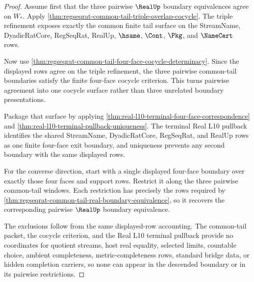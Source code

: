\begin{proof}
Assume first that the three pairwise $\RealUp$ boundary equivalences agree on $W_\ast$. Apply \autoref{thm:regseqrat-common-tail-triple-overlap-cocycle}. The triple refinement exposes exactly the common finite tail surface on the StreamName, DyadicRatCore, RegSeqRat, RealUp, $\hsame$, $\Cont$, $\Pkg$, and $\NameCert$ rows.

Now use \autoref{thm:regseqrat-common-tail-four-face-cocycle-determinacy}. Since the displayed rows agree on the triple refinement, the three pairwise common-tail boundaries satisfy the finite four-face cocycle criterion. This turns pairwise agreement into one cocycle surface rather than three unrelated boundary presentations.

Package that surface by applying \autoref{thm:real-l10-terminal-four-face-correspondence} and \autoref{thm:real-l10-terminal-pullback-uniqueness}. The terminal Real L10 pullback identifies the shared StreamName, DyadicRatCore, RegSeqRat, and RealUp rows as one finite four-face exit boundary, and uniqueness prevents any second boundary with the same displayed rows.

For the converse direction, start with a single displayed four-face boundary over exactly those four faces and support rows. Restrict it along the three pairwise common-tail windows. Each restriction has precisely the rows required by \autoref{thm:regseqrat-common-tail-real-boundary-equivalence}, so it recovers the corresponding pairwise $\RealUp$ boundary equivalence.

The exclusions follow from the same displayed-row accounting. The common-tail packet, the cocycle criterion, and the Real L10 terminal pullback provide no coordinates for quotient streams, host real equality, selected limits, countable choice, ambient completeness, metric-completeness rows, standard bridge data, or hidden completion carriers, so none can appear in the descended boundary or in its pairwise restrictions.
\end{proof}


